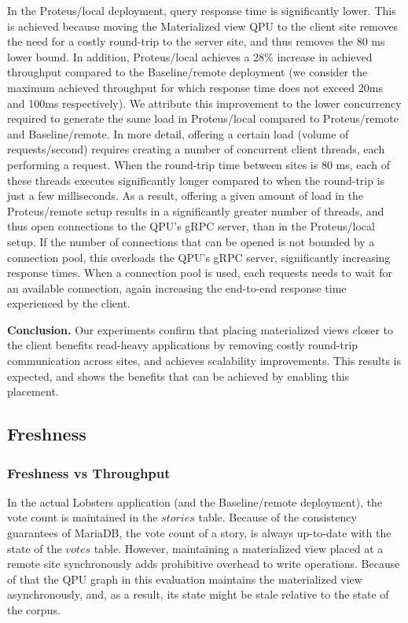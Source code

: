 In the Proteus/local deployment, query response time is significantly lower.
This is achieved because moving the Materialized view QPU to the client site removes the need for a costly round-trip to
the server site, and thus removes the 80 ms lower bound.
In addition, Proteus/local achieves a 28\% increase in achieved throughput compared to the Baseline/remote deployment
(we consider the maximum achieved throughput for which response time does not exceed 20ms and 100ms respectively).
We attribute this improvement to the lower concurrency required to generate the same load in Proteus/local
compared to Proteus/remote and Baseline/remote.
In more detail, offering a certain load (volume of requests/second) requires creating a number of concurrent client threads,
each performing a request.
When the round-trip time between sites is 80 ms, each of these threads executes significantly longer compared to
when the round-trip is just a few milliseconds.
As a result, offering a given amount of load in the Proteus/remote setup results in a significantly greater number
of threads, and thus open connections to the QPU's gRPC server, than in the Proteus/local setup.
If the number of connections that can be opened is not bounded by a connection pool, this overloads the QPU's gRPC server,
significantly increasing response times.
When a connection pool is used, each requests needs to wait for an available connection,
again increasing the end-to-end response time experienced by the client.

\medskip
\noindent
\textbf{Conclusion.} Our experiments confirm that placing materialized views closer to the client benefits read-heavy applications
by removing costly round-trip communication across sites, and achieves scalability improvements.
This results is expected, and shows the benefits that can be achieved by enabling this placement.


\subsection{Freshness}
\label{sec:eval_freshness}

\subsubsection{Freshness vs Throughput}
\label{sec:eval_freshness_throughput}

In the actual Lobsters application (and the Baseline/remote deployment),
the vote count is maintained in the $stories$ table.
Because of the consistency guarantees of MariaDB,
the vote count of a story, is always up-to-date with the state of the $votes$ table.
However, maintaining a materialized view placed at a remote site synchronously adds prohibitive overhead to write operations.
Because of that the QPU graph in this evaluation maintains the materialized view asynchronously, and, as a result,
its state might be stale relative to the state of the corpus.

